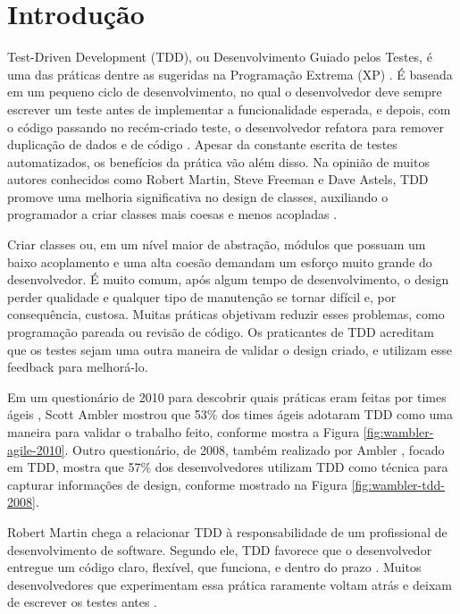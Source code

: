 \chapter{Introdução}
\label{cap:introducao}

Test-Driven Development (TDD), ou Desenvolvimento Guiado pelos Testes,
é uma das práticas dentre as sugeridas na Programação
Extrema (XP) \cite{XPExplained}. É baseada em um pequeno ciclo de
desenvolvimento, no qual o desenvolvedor deve sempre escrever um teste antes
de implementar a funcionalidade esperada, e depois, com o código
passando no recém-criado teste, o desenvolvedor refatora para 
remover duplicação de dados e de código \cite{TDDByExample}.
Apesar da constante escrita de testes automatizados, os benefícios da
prática vão além disso. Na opinião de muitos autores conhecidos como Robert Martin,
Steve Freeman e Dave Astels, TDD promove
uma melhoria significativa no design de classes, auxiliando o programador a
criar classes mais coesas e menos acopladas \cite{TDDByExample} \cite{GOOS} 
\cite{astels-tdd}.

Criar classes ou, em um nível maior de abstração, módulos que possuam um baixo
acoplamento e uma alta coesão demandam um esforço muito grande do desenvolvedor. 
É muito comum, após algum tempo de desenvolvimento, o design perder qualidade
e qualquer tipo de manutenção se tornar difícil e, por consequência, custosa.
Muitas práticas objetivam reduzir esses problemas, como programação pareada ou
revisão de código. Os praticantes de TDD acreditam que os testes sejam uma outra
maneira de validar o design criado, e utilizam esse feedback para melhorá-lo.

Em um questionário de 2010 para descobrir quais práticas eram feitas por times
ágeis \cite{wambler-survey-agile}, Scott Ambler mostrou que 53\% dos times ágeis
adotaram TDD como uma maneira para validar o trabalho feito, conforme mostra a 
Figura \ref{fig:wambler-agile-2010}. Outro questionário, de 2008, também realizado por Ambler
\cite{wambler-survey-tdd}, focado em TDD, mostra que 57\% dos desenvolvedores 
utilizam TDD como técnica para capturar informações de design, conforme mostrado
na Figura \ref{fig:wambler-tdd-2008}.

Robert Martin chega a relacionar TDD à responsabilidade de um 
profissional de desenvolvimento de software. 
Segundo ele, TDD favorece que o desenvolvedor entregue um 
código claro, flexível, que funciona, e dentro do prazo \cite{martin-profissionalismo}.
Muitos desenvolvedores que experimentam essa prática raramente voltam atrás e deixam
de escrever os testes antes \cite{tdd-fearless}. 

